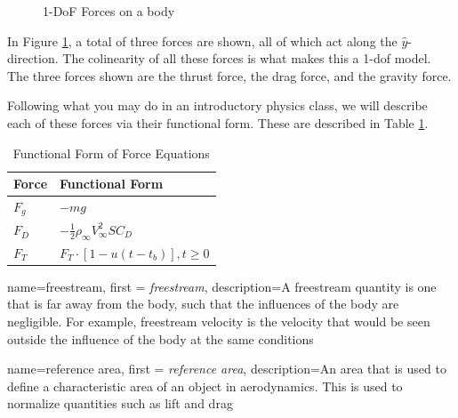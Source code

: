 \documentclass[12pt]{report}
\begin{document}
\begin{figure}[ht]
    \caption{1-DoF Forces on a body}
    \label{fig: 1DoF forces}
\end{figure}

In Figure \ref{fig: 1DoF forces}, a total of three forces are shown, all of which act along the $\hat{y}$-direction. The colinearity of all these forces is what makes this a 1-\gls{dof} model. The three forces shown are the thrust force, the drag force, and the gravity force.

Following what you may do in an introductory physics class, we will describe each of these forces via their functional form. These are described in Table \ref{Force Equations 1 DoF}. 

\begin{table}
\centering
\caption{Functional Form of Force Equations}
\label{Force Equations 1 DoF}
\begin{tabular}{l | l}
Force & Functional Form \\
\hline
 $F_g$&  $-mg$\\
 $F_D$&  $-\frac{1}{2} \rho_{\infty} V^2_{\infty}SC_D$\\
 $F_T$&  $F_T\cdot[1-u(t-t_b)], t\ge0$\\

\end{tabular}

\end{table}
{
    name=freestream,
    first = {\textit{freestream}},
    description={A freestream quantity is one that is far away from the body, such that the influences of the body are negligible. For example, freestream velocity is the velocity that would be seen outside the influence of the body at the same conditions}
}

{
    name=reference area,
    first = \textit{reference area},
    description={An area that is used to define a characteristic area of an object in aerodynamics. This is used to normalize quantities such as lift and drag}
    }
\end{document}
